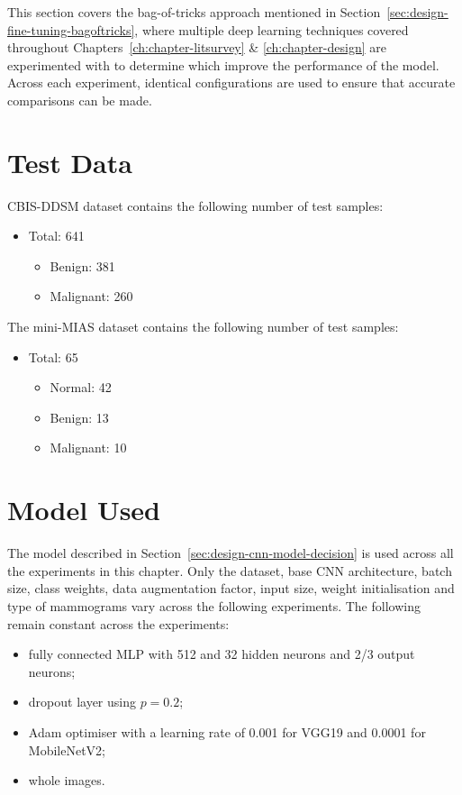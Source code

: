 This section covers the bag-of-tricks approach mentioned in Section~\ref{sec:design-fine-tuning-bagoftricks}, where multiple deep learning techniques covered throughout Chapters~\ref{ch:chapter-litsurvey} \& \ref{ch:chapter-design} are experimented with to determine which improve the performance of the model. Across each experiment, identical configurations are used to ensure that accurate comparisons can be made.


\section{Test Data}

CBIS-DDSM dataset contains the following number of test samples:
\begin{itemize}
    \item Total: 641
    \begin{itemize}
        \item Benign: 381
        \item Malignant: 260
    \end{itemize}
\end{itemize}

The mini-MIAS dataset contains the following number of test samples:
\begin{itemize}
    \item Total: 65
    \begin{itemize}
        \item Normal: 42
        \item Benign: 13
        \item Malignant: 10
    \end{itemize}
\end{itemize}


\section{Model Used}

The model described in Section~\ref{sec:design-cnn-model-decision} is used across all the experiments in this chapter. Only the dataset, base CNN architecture, batch size, class weights, data augmentation factor, input size, weight initialisation and type of mammograms vary across the following experiments. The following remain constant across the experiments:
\begin{itemize}
    \item fully connected MLP with 512 and 32 hidden neurons and 2/3 output neurons;
    \item dropout layer using $p=0.2$;
    \item Adam optimiser with a learning rate of 0.001 for VGG19 and 0.0001 for MobileNetV2;
    \item whole images.
\end{itemize}

